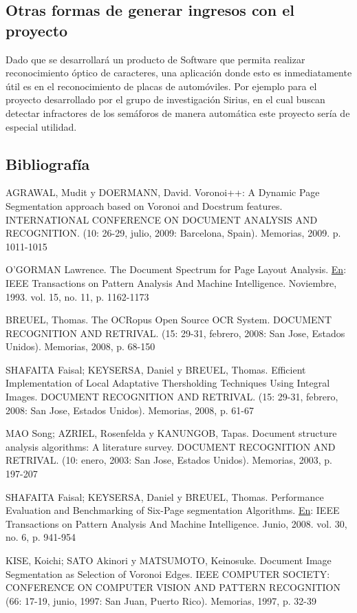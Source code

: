 \documentclass[a4paper, 12pt, oneside]{article}
\begin{document}
	\subsection{Otras formas de generar ingresos con el proyecto}
	Dado que se desarrollará un producto de Software que permita realizar reconocimiento óptico de caracteres, una aplicación donde esto es inmediatamente útil es en el reconocimiento de placas de automóviles. Por ejemplo para el proyecto desarrollado por el grupo de investigación Sirius, en el cual buscan detectar infractores de los semáforos de manera automática este proyecto sería de especial utilidad.
	
	\clearpage
	\begin{center}
	\section{Bibliografía}
	\end{center}
	AGRAWAL, Mudit y DOERMANN, David. Voronoi++: A Dynamic Page Segmentation approach based on Voronoi and Docstrum features. INTERNATIONAL CONFERENCE ON DOCUMENT ANALYSIS AND RECOGNITION. (10: 26-29, julio, 2009: Barcelona, Spain). Memorias, 2009. p. 1011-1015
	
	O'GORMAN Lawrence. The Document Spectrum for Page Layout Analysis. \underline{En}: IEEE Transactions on Pattern Analysis And Machine Intelligence. Noviembre, 1993. vol. 15, no. 11, p. 1162-1173
	
	BREUEL, Thomas. The OCRopus Open Source OCR System. DOCUMENT RECOGNITION AND RETRIVAL. (15: 29-31, febrero, 2008: San Jose, Estados Unidos). Memorias, 2008, p. 68-150
	
	SHAFAITA Faisal; KEYSERSA, Daniel y BREUEL, Thomas. Efficient Implementation of Local Adaptative Thersholding Techniques Using Integral Images. DOCUMENT RECOGNITION AND RETRIVAL. (15: 29-31, febrero, 2008: San Jose, Estados Unidos). Memorias, 2008, p. 61-67
	
	MAO Song; AZRIEL, Rosenfelda y KANUNGOB, Tapas. Document structure analysis algorithms: A literature survey. DOCUMENT RECOGNITION AND RETRIVAL. (10: enero, 2003: San Jose, Estados Unidos). Memorias, 2003, p. 197-207
	
	SHAFAITA Faisal; KEYSERSA, Daniel y BREUEL, Thomas. Performance Evaluation and Benchmarking of Six-Page segmentation Algorithms. \underline{En}: IEEE Transactions on Pattern Analysis And Machine Intelligence. Junio, 2008. vol. 30, no. 6, p. 941-954
	
	KISE, Koichi; SATO Akinori y MATSUMOTO, Keinosuke. Document Image Segmentation as Selection of Voronoi Edges. IEEE COMPUTER SOCIETY: CONFERENCE ON COMPUTER VISION AND PATTERN RECOGNITION (66: 17-19, junio, 1997: San Juan, Puerto Rico). Memorias, 1997, p. 32-39
	
\end{document}
